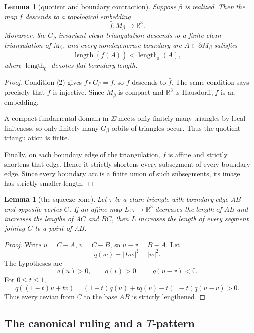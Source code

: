 \documentclass[12pt]{article}
\newtheorem{lemma}[theorem]{Lemma}
\newcommand{\R}{\mathbb R}
\newcommand{\len}{\operatorname{length}}
\begin{document}
\begin{lemma}[quotient and boundary contraction]
Suppose \(\beta\) is realized.  Then the map \(f\) descends to a topological embedding
\[
\bar f:M_\beta\longrightarrow \R^3 .
\]
Moreover, the \(G_\beta\)-invariant clean triangulation descends to a finite clean triangulation of \(M_\beta\), and every nondegenerate boundary arc \(A\subset \partial M_\beta\) satisfies
\[
\len(\bar f(A))<\len_0(A),
\]
where \(\len_0\) denotes flat boundary length.
\end{lemma}

\begin{proof}
Condition (2) gives \(f\circ G_\beta=f\), so \(f\) descends to \(\bar f\).  The same condition says precisely that \(\bar f\) is injective.  Since \(M_\beta\) is compact and \(\R^3\) is Hausdorff, \(\bar f\) is an embedding.

A compact fundamental domain in \(\Sigma\) meets only finitely many triangles by local finiteness, so only finitely many \(G_\beta\)-orbits of triangles occur.  Thus the quotient triangulation is finite.

Finally, on each boundary edge of the triangulation, \(f\) is affine and strictly shortens that edge.  Hence it strictly shortens every subsegment of every boundary edge.  Since every boundary arc is a finite union of such subsegments, its image has strictly smaller length.
\end{proof}

\begin{lemma}[the squeeze cone]
Let \(\tau\) be a clean triangle with boundary edge \(AB\) and opposite vertex \(C\).  If an affine map \(L:\tau\to \R^3\) decreases the length of \(AB\) and increases the lengths of \(AC\) and \(BC\), then \(L\) increases the length of every segment joining \(C\) to a point of \(AB\).
\end{lemma}

\begin{proof}
Write \(u=C-A\), \(v=C-B\), so \(u-v=B-A\).  Let
\[
q(w)=|Lw|^2-|w|^2 .
\]
The hypotheses are
\[
q(u)>0,\qquad q(v)>0,\qquad q(u-v)<0.
\]
For \(0\le t\le 1\),
\[
q((1-t)u+tv)
=(1-t)q(u)+tq(v)-t(1-t)q(u-v)>0.
\]
Thus every cevian from \(C\) to the base \(AB\) is strictly lengthened.
\end{proof}

\subsection{The canonical ruling and a \(T\)-pattern}
\end{document}
